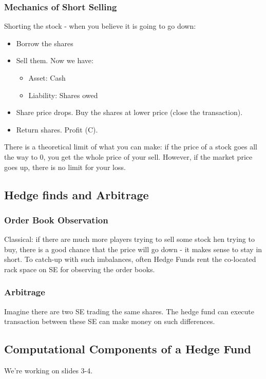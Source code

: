 \documentclass{scrartcl}
\begin{document}
\subsubsection{Mechanics of Short Selling}
\label{sec:MechanicsOfShortSelling}
Shorting the stock - when you believe it is going to go down:
\begin{itemize}
\item Borrow the shares
\item Sell them. Now we have:
  \begin{itemize}
  \item Asset: Cash
  \item Liability: Shares owed
  \end{itemize}
\item Share price drops. Buy the shares at lower price (close the transaction). 
\item Return shares. Profit (C).
\end{itemize}
There is a theoretical limit of what you can make: if the price of a stock goes
all the way to 0, you get the whole price of your sell. However, if the market
price goes up, there is no limit for your loss.

\subsection{Hedge finds and Arbitrage}
\label{sec:HedgeFundsAndArbitrage}

\subsubsection{Order Book Observation}
\label{sec:OrderBookObservation}
Classical: if there are much more players trying to sell some stock hen trying
to buy, there is a good chance that the price will go down - it makes sense to
stay in short. To catch-up with such imbalances, often Hedge Funds rent the
co-located rack space on SE for observing the order books.

\subsubsection{Arbitrage}
\label{sec:HedgeFundsAndArbitrage}
Imagine there are two SE trading the same shares. The hedge fund can execute
transaction between these SE can make money on such differences.

\subsection{Computational Components of a Hedge Fund}
\label{sec:HFAnatomy}
We're working on slides 3-4. 
\end{document}
